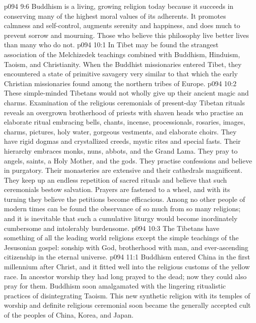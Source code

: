 \vs p094 9:6 Buddhism is a living, growing religion today because it succeeds in conserving many of the highest moral values of its adherents. It promotes calmness and self\hyp{}control, augments serenity and happiness, and does much to prevent sorrow and mourning. Those who believe this philosophy live better lives than many who do not.
\vs p094 10:1 In Tibet may be found the strangest association of the Melchizedek teachings combined with Buddhism, Hinduism, Taoism, and Christianity. When the Buddhist missionaries entered Tibet, they encountered a state of primitive savagery very similar to that which the early Christian missionaries found among the northern tribes of Europe.
\vs p094 10:2 These simple\hyp{}minded Tibetans would not wholly give up their ancient magic and charms. Examination of the religious ceremonials of present\hyp{}day Tibetan rituals reveals an overgrown brotherhood of priests with shaven heads who practise an elaborate ritual embracing bells, chants, incense, processionals, rosaries, images, charms, pictures, holy water, gorgeous vestments, and elaborate choirs. They have rigid dogmas and crystallized creeds, mystic rites and special fasts. Their hierarchy embraces monks, nuns, abbots, and the Grand Lama. They pray to angels, saints, a Holy Mother, and the gods. They practise confessions and believe in purgatory. Their monasteries are extensive and their cathedrals magnificent. They keep up an endless repetition of sacred rituals and believe that such ceremonials bestow salvation. Prayers are fastened to a wheel, and with its turning they believe the petitions become efficacious. Among no other people of modern times can be found the observance of so much from so many religions; and it is inevitable that such a cumulative liturgy would become inordinately cumbersome and intolerably burdensome.
\vs p094 10:3 The Tibetans have something of all the leading world religions except the simple teachings of the Jesusonian gospel: sonship with God, brotherhood with man, and ever\hyp{}ascending citizenship in the eternal universe.
\vs p094 11:1 Buddhism entered China in the first millennium after Christ, and it fitted well into the religious customs of the yellow race. In ancestor worship they had long prayed to the dead; now they could also pray for them. Buddhism soon amalgamated with the lingering ritualistic practices of disintegrating Taoism. This new synthetic religion with its temples of worship and definite religious ceremonial soon became the generally accepted cult of the peoples of China, Korea, and Japan.
